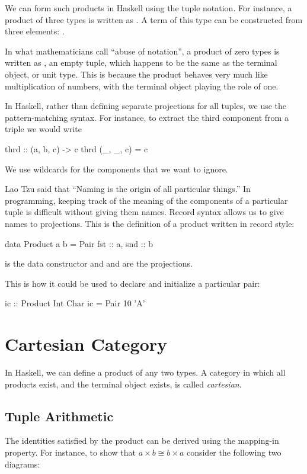 \documentclass[DaoFP]{subfiles}
\begin{document}
We can form such products in Haskell using the tuple notation. For instance, a product of three types is written as . A term of this type can be constructed from three elements: . 

In what mathematicians call ``abuse of notation'', a product of zero types is written as \hask{()}, an empty tuple, which happens to be the same as the terminal object, or unit type. This is because the product behaves very much like multiplication of numbers, with the terminal object playing the role of one.

In Haskell, rather than defining separate projections for all tuples, we use the pattern-matching syntax. For instance, to extract the third component from a triple we would write

\begin{haskell}
thrd :: (a, b, c) -> c
thrd (_, _, c) = c
\end{haskell}
We use wildcards for the components that we want to ignore.

Lao Tzu said that ``Naming is the origin of all particular things.'' In programming, keeping track of the meaning of the components of a particular tuple is difficult without giving them names. Record syntax allows us to give names to projections. This is the definition of a product written in record style:
\begin{haskell}
data Product a b = Pair { fst :: a, snd :: b }
\end{haskell}
 is the data constructor and  and  are the projections. 

This is how it could be used to declare and initialize a particular pair:
\begin{haskell}
ic :: Product Int Char
ic = Pair 10 'A'
\end{haskell}

\section{Cartesian Category}

In Haskell, we can define a product of any two types. A category in which all products exist, and the terminal object exists, is called \emph{cartesian}. 

\subsection{Tuple Arithmetic}

The identities satisfied by the product can be derived using the mapping-in property. For instance, to show that $a \times b \cong b \times a$ consider the following two diagrams:
\end{document}
